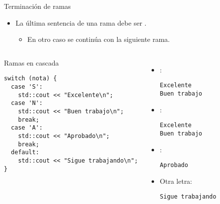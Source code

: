 \begin{frame}[t,fragile]{Terminación de ramas}
\begin{itemize}
  \item La última sentencia de una rama debe ser .
    \begin{itemize}
      \item En otro caso se continúa con la siguiente rama.
    \end{itemize}
\end{itemize}

\begin{columns}[T]

\begin{block}{Ramas en cascada}
\begin{lstlisting}
switch (nota) {
  case 'S':
    std::cout << "Excelente\n";
  case 'N':
    std::cout << "Buen trabajo\n";
    break;
  case 'A':
    std::cout << "Aprobado\n";
    break;
  default:
    std::cout << "Sigue trabajando\n";
}
\end{lstlisting}
\end{block}

{\scriptsize
\begin{itemize}
  \item {}:
\begin{lstlisting}[style=terminal,basicstyle=\tiny]
Excelente
Buen trabajo
\end{lstlisting}
  \item {}:
\begin{lstlisting}[style=terminal,basicstyle=\tiny]
Excelente
Buen trabajo
\end{lstlisting}
  \item {}:
\begin{lstlisting}[style=terminal,basicstyle=\tiny]
Aprobado
\end{lstlisting}
  \item Otra letra:
\begin{lstlisting}[style=terminal,basicstyle=\tiny]
Sigue trabajando
\end{lstlisting}
\end{itemize}
}
\end{columns}
\end{frame}

